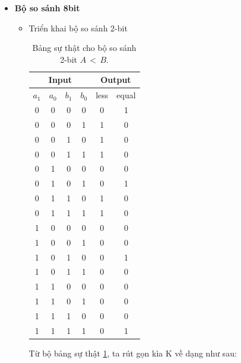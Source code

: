 \begin{itemize}[label=-]
	\item \textbf{Bộ so sánh 8bit}
	
	\begin{itemize}[label=+]
		\item Triển khai bộ so sánh 2-bit
		
		\begin{table}[H]
			\centering
			\begin{tabular}{|c|c|c|c|c|c|}
				\hline 
				\multicolumn{4}{|c|}{Input} & \multicolumn{2}{c|}{Output}\\
				\hline
				$ a_{1} $ & $ a_{0} $ & $ b_{1} $ & $ b_{0} $ & less & equal \\
				\hline
				0 & 0 & 0 & 0 & 0 & 1\\
				\hline
				0 & 0 & 0 & 1 & 1 & 0\\
				\hline
				0 & 0 & 1 & 0 & 1 & 0\\
				\hline
				0 & 0 & 1 & 1 & 1 & 0\\
				\hline
				0 & 1 & 0 & 0 & 0 & 0\\
				\hline
				0 & 1 & 0 & 1 & 0 & 1\\
				\hline
				0 & 1 & 1 & 0 & 1 & 0\\
				\hline
				0 & 1 & 1 & 1 & 1 & 0\\
				\hline
				1 & 0 & 0 & 0 & 0 & 0\\
				\hline
				1 & 0 & 0 & 1 & 0 & 0\\
				\hline
				1 & 0 & 1 & 0 & 0 & 1\\
				\hline
				1 & 0 & 1 & 1 & 0 & 0\\
				\hline
				1 & 1 & 0 & 0 & 0 & 0\\
				\hline
				1 & 1 & 0 & 1 & 0 & 0\\
				\hline
				1 & 1 & 1 & 0 & 0 & 0\\
				\hline
				1 & 1 & 1 & 1 & 0 & 1\\
				\hline
			\end{tabular}
			\caption{Bảng sự thật cho bộ so sánh 2-bit $ A \,<\, B $.}
			\label{tab: comparator 2bit}
		\end{table}
	
		Từ bộ bảng sự thật \ref{tab: comparator 2bit}, ta rút gọn kìa K về dạng như sau:
		

\end{itemize}
\end{itemize}
